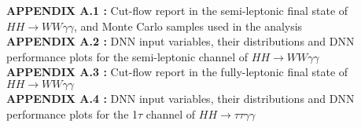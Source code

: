 \singlespacing
\textbf{APPENDIX A.1 :} Cut-flow report in the semi-leptonic final state of $HH\rightarrow{WW\gamma\gamma}$, and Monte Carlo samples used in the analysis \\
\textbf{APPENDIX A.2 :} DNN input variables, their distributions and DNN performance plots for the semi-leptonic channel of $HH\rightarrow{WW\gamma\gamma}$\\
\textbf{APPENDIX A.3 :} Cut-flow report in the fully-leptonic final state of $HH\rightarrow{WW\gamma\gamma}$ \\
\textbf{APPENDIX A.4 :} DNN input variables, their distributions and DNN performance plots for the 1$\tau$ channel of $HH\rightarrow{\tau\tau\gamma\gamma}$ \\

\newpage